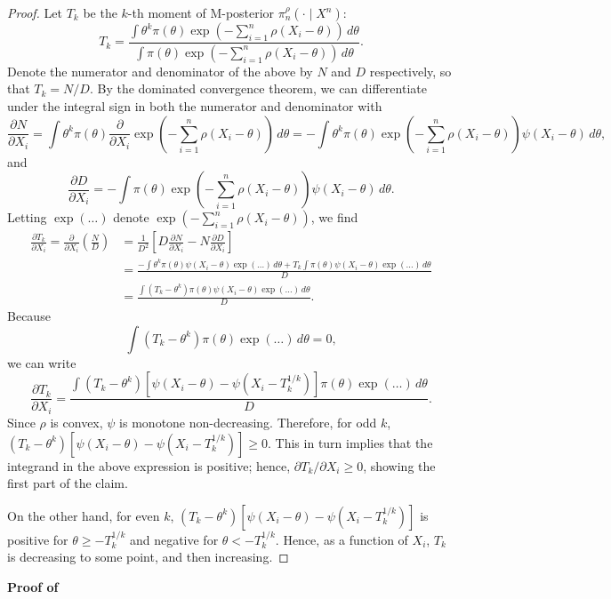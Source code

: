 \documentclass[11pt, oneside]{amsart}
\theoremstyle{definition}   %
\newcommand{\loss}{\rho}
\newcommand{\score}{\psi}
\newcommand{\mposterior}{\pi_n^{\loss}}
\begin{document}
\begin{proof}
    Let \( T_k \) be the \( k\)-th moment of M-posterior \( \mposterior(\cdot \mid X^n)\):
    \begin{equation}
    \label{eq:Tk}
        T_k = \frac{\int \theta^k \pi(\theta) \exp \left (-\sum_{i=1}^n \rho(X_i - \theta) \right) \, d\theta}{\int \pi(\theta) \exp \left (-\sum_{i=1}^n \rho(X_i - \theta) \right) \, d\theta}.
    \end{equation}
    Denote the numerator and denominator of the above by $N$ and $D$ respectively, so that $T_k = N/D$.  By the dominated convergence theorem, we can differentiate under the integral sign in both the numerator and denominator with
    \[ \frac{\partial N}{\partial X_i} =  \int \theta^k \pi(\theta) \frac{\partial}{\partial X_i}\exp \left (-\sum_{i=1}^n \rho(X_i - \theta) \right) \, d\theta =  -\int \theta^k \pi(\theta) \exp \left (-\sum_{i=1}^n \rho(X_i - \theta) \right) \psi(X_i - \theta)\, d\theta,\]
    and
        \[ \frac{\partial D}{\partial X_i} = -\int \pi(\theta) \exp \left (-\sum_{i=1}^n \rho(X_i - \theta) \right) \psi(X_i - \theta)\, d\theta.\]
    Letting \(\exp(\ldots)\) denote \(\exp \left (-\sum_{i=1}^n \rho(X_i - \theta) \right)\), we find
    \[
    \begin{split}
        \frac{\partial T_k}{\partial X_i} 
        =
        \frac{\partial}{\partial X_i} \left ( \frac{N}{D}\right ) 
        &=
        \frac{1}{D^2} \left[D\frac{\partial N}{\partial X_i} - N\frac{\partial D}{\partial X_i} \right] \\
        &=
        \frac{- \int \theta^k \pi(\theta) \score (X_i - \theta) \exp(\ldots) \, d\theta + T_k \int \pi(\theta) \score(X_i - \theta) \exp(\ldots) \, d\theta }{D } \\
        &=
        \frac{\int (T_k - \theta^k)  \pi(\theta) \score(X_i - \theta) \exp(\ldots) \, d\theta }{D}.
    \end{split}
    \]
    Because
    \[
        \int (T_k - \theta^k) \pi(\theta) \exp(\ldots) \, d\theta = 0,
    \]
    we can write
    \[
        \frac{\partial T_k}{\partial X_i} 
        =
        \frac{\int (T_k - \theta^k) \left [ \score(X_i - \theta) - \score(X_i - T_k^{1/k}) \right ] \pi(\theta) \exp(\ldots) \, d\theta }{D}.
    \]
    Since \( \loss \) is convex, \( \score\) is monotone non-decreasing. Therefore, for odd \( k \), \( (T_k - \theta^k) [ \score(X_i - \theta) - \score(X_i - T_k^{1/k}) ] \geq 0. \) This in turn implies that the integrand in the above expression is positive; hence, \( {\partial T_k}/{\partial X_i} \geq 0 \), showing the first part of the claim.

    On the other hand, for even \( k \), \( (T_k - \theta^k)  [ \score(X_i - \theta) - \score(X_i - T_k^{1/k})  ] \) is positive for \( \theta \geq -T_k^{1/k}\) and negative for \( \theta < -T_k^{1/k}\). Hence, as a function of \( X_i\), \( T_k\) is decreasing to some point, and then increasing.
\end{proof}
%
\noindent \textbf{Proof of }
\end{document}
